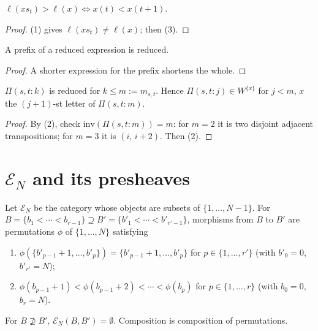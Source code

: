 \documentclass[11pt]{article}
\newcommand{\EN}{\mathcal{E}_N}
\newcommand{\altw}[3]{\Pi(#1,#2:#3)}
\begin{document}
\begin{lemma}\label{lem:ascent}
  $\ell(xs_t) > \ell(x) \iff x(t) < x(t+1)$.
\end{lemma}
\begin{proof}
  (1) gives $\ell(xs_t) \neq \ell(x)$; then (3).
\end{proof}

\begin{lemma}\label{lem:prefix}
  A prefix of a reduced expression is reduced.
\end{lemma}
\begin{proof}
  A shorter expression for the prefix shortens the whole.
\end{proof}

\begin{lemma}\label{lem:dihedral}
  $\altw stk$ is reduced for $k \le m := m_{s,t}$. Hence $\altw stj \in W^{\{x\}}$ for $j < m$, $x$
  the $(j+1)$-st letter of $\altw stm$.
\end{lemma}
\begin{proof}
  By (2), check $\mathrm{inv}(\altw stm) = m$: for $m = 2$ it is two
  disjoint adjacent transpositions; for $m = 3$ it is $(i,\,i+2)$. Then (2).
\end{proof}

\section{\texorpdfstring{$\EN$}{E\_N} and its presheaves}

\begin{definition}[{\cite[Def.~6.11]{PZ}}]\label{def:EN}
  Let $\EN$ be the category whose objects are subsets of $\{1,\dots,N-1\}$. For $B = \{b_1 < \cdots <
  b_{r-1}\} \supseteq B' = \{b'_1 < \cdots < b'_{r'-1}\}$, morphisms from $B$ to $B'$ are permutations
  $\phi$ of $\{1,\dots,N\}$ satisfying
  \begin{enumerate}
    \item[(x)] $\phi(\{b'_{p-1}+1,\dots,b'_p\}) = \{b'_{p-1}+1,\dots,b'_p\}$ for $p \in \{1,\dots,r'\}$
      (with $b'_0 = 0$, $b'_{r'} = N$);
    \item[(y)] $\phi(b_{p-1}+1) < \phi(b_{p-1}+2) < \cdots < \phi(b_p)$ for $p \in \{1,\dots,r\}$ (with
      $b_0 = 0$, $b_r = N$).
  \end{enumerate}
  For $B \not\supseteq B'$, $\EN(B,B') = \emptyset$. Composition is composition of permutations.
\end{definition}
\end{document}
